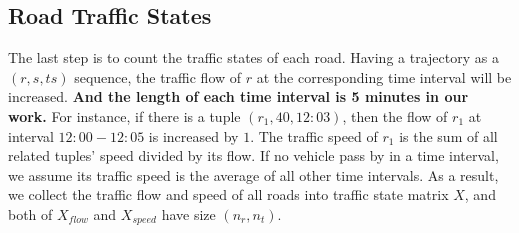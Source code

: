 \subsection{Road Traffic States}
The last step is to count the traffic states of each road. Having a trajectory as a $(r, s, ts)$ sequence, the traffic flow of $r$ at the corresponding time interval will be increased. \textbf{And the length of each time interval is 5 minutes in our work.} For instance, if there is a tuple $(r_1, 40, 12:03)$, then the flow of $r_1$ at interval $12:00 - 12:05$ is increased by $1$. The traffic speed of $r_1$ is the sum of all related tuples' speed divided by its flow. If no vehicle pass by in a time interval, we assume its traffic speed is the average of all other time intervals. As a result, we collect the traffic flow and speed of all roads into traffic state matrix $X$, and both of $X_{flow}$ and $X_{speed}$ have size $(n_r, n_t)$.
